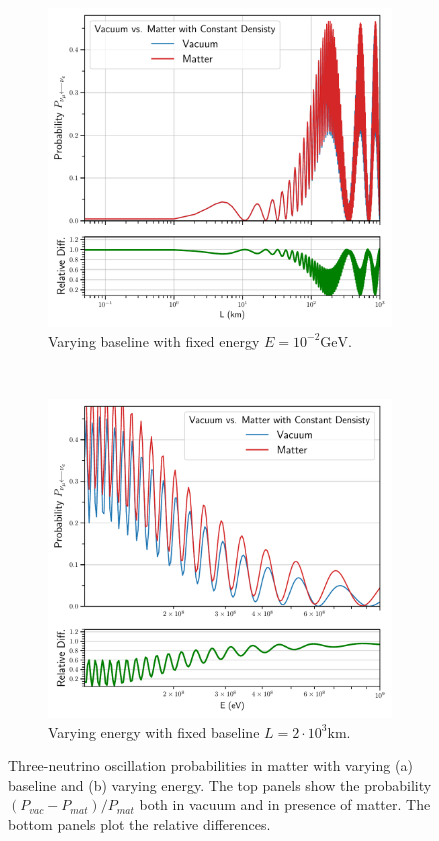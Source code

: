 \documentclass[twocolumn,secnumarabic,amssymb, nobibnotes, aps, prd,10pt]{revtex4-1}
\begin{document}
\begin{figure}
\captionsetup[subfigure]{aboveskip=-1.5pt,belowskip=-1.5pt} 
\begin{subfigure}{1.05\linewidth}
\includegraphics[width=\linewidth]{DistVacMatt.pdf}
\caption{Varying baseline with fixed energy $E=10^{-2} \mathrm{GeV}$.} 
\label{higgs:sspt} 
\end{subfigure} 
\\
\begin{subfigure}{1.05\linewidth}
\includegraphics[width=\linewidth]{EngVacMatt.pdf}
\caption{Varying energy with fixed baseline $L=2 \cdot 10^3 \mathrm{km}$.} 
\label{fig:comparison} 
\end{subfigure}
\caption{Three-neutrino oscillation probabilities in matter with varying (a) baseline
and (b) varying energy. The top panels show the probability $\left( P_{vac} - P_{mat} 
\right) / P_{mat}$ both in vacuum and in presence of matter. The bottom panels plot
the relative differences.}
\end{figure}
\end{document}
